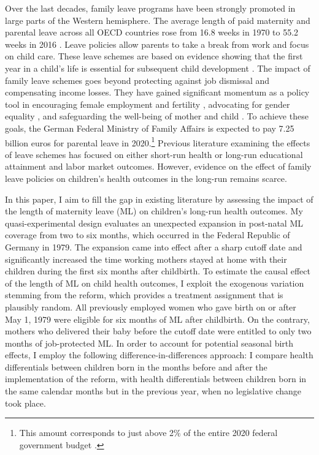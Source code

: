 

Over the last decades, family leave programs have been strongly promoted in large parts of the Western hemisphere. The average length of paid maternity and parental leave across all OECD countries rose from 16.8 weeks in 1970 to 55.2 weeks in 2016 \citep{oecd_data_leave}. Leave policies allow parents to take a break from work and focus on child care. These leave schemes are based on evidence showing that the first year in a child's life is essential for subsequent child development \citep{currie2011human}. The impact of family leave schemes goes beyond protecting against job dismissal and compensating income losses. They have gained significant momentum as a policy tool in encouraging female employment \citep{blau2013} and fertility \citep{RafaelLaliveandJosefZweimuller2009}, advocating for gender equality \citep{kotsadam2011state}, and safeguarding the well-being of mother and child \citep{butikofer2018impact}. To achieve these goals, the German Federal Ministry of Family Affairs is expected to pay 7.25 billion euros for parental leave in 2020.\footnote{This amount corresponds to just above 2\% of the entire 2020 federal government budget \citep{federal_budget}.} Previous literature examining the effects of leave schemes has focused on either short-run health or long-run educational attainment and labor market outcomes. However, evidence on the effect of family leave policies on children's health outcomes in the long-run remains scarce.


In this paper, I aim to fill the gap in existing literature by assessing the impact of the length of maternity leave (ML) on children’s long-run health outcomes. My quasi-experimental design evaluates an unexpected expansion in post-natal ML coverage from two to six months, which occurred in the Federal Republic of Germany in 1979. The expansion came into effect after a sharp cutoff date and significantly increased the time working mothers stayed at home with their children during the first six months after childbirth. To estimate the causal effect of the length of ML on child health outcomes, I exploit the exogenous variation stemming from the reform, which provides a treatment assignment that is plausibly random. All previously employed women who gave birth on or after May 1, 1979 were eligible for six months of ML after childbirth. On the contrary, mothers who delivered their baby before the cutoff date were entitled to only two months of job-protected ML. In order to account for potential seasonal birth effects, I employ the following difference-in-differences approach: I compare health differentials between children born in the months before and after the implementation of the reform, with health differentials between children born in the same calendar months but in the previous year, when no legislative change took place.


